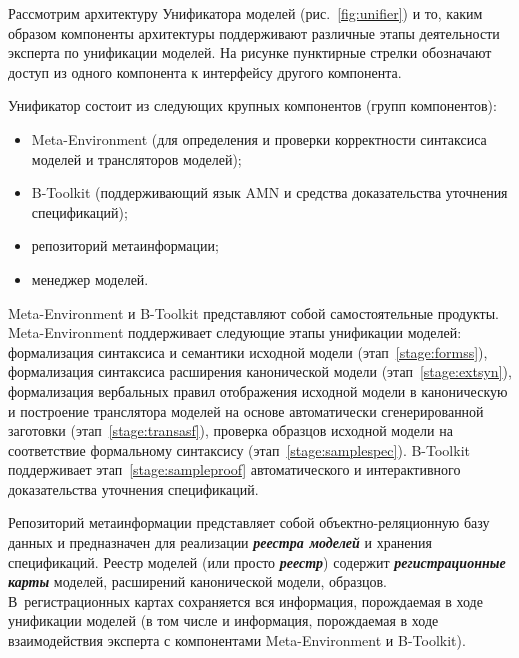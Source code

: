 \begin{multicols}{2}
Рассмотрим архитектуру Унификатора моделей (рис.~\ref{fig:unifier})
и то, каким образом компоненты архитектуры
поддерживают различные этапы дея\-тель\-ности эксперта по унификации моделей.
На рисунке пунктирные стрелки обозначают доступ из одного компонента
к интерфейсу другого компонента.

Унификатор состоит из следующих крупных компонентов (групп компонентов):
\begin{itemize}
\item Meta-Environment (для определения и проверки корректности
синтаксиса моделей и трансляторов моделей);
\item B-Toolkit (поддерживающий язык AMN и средства
доказательства уточнения спецификаций);
\item репозиторий метаинформации;
\item менеджер моделей.
\end{itemize}

Meta-Environment и B-Toolkit представляют собой самостоятельные продукты.
Meta-Environment поддерживает следующие этапы унификации моделей:
формализация синтаксиса и семантики исходной модели (этап~\ref{stage:formss}),
формализация синтаксиса расширения канонической модели (этап~\ref{stage:extsyn}),\linebreak
формализация вербальных правил отображения исходной модели в каноническую
и построение транслятора моделей на основе автоматически сгенерированной заготовки
(этап~\ref{stage:transasf}), проверка образцов исходной модели
на соответствие формальному синтаксису (этап~\ref{stage:samplespec}).
B-Toolkit поддерживает этап~\ref{stage:sampleproof} автоматического и интерактивного
доказательства уточнения спецификаций.

Репозиторий метаинформации представляет собой объ\-ек\-т\-но-ре\-ля\-ци\-он\-ную базу
данных и предна\-зна\-чен для реализации {\bfseries\textit{реестра моделей}}
и хра\-нения спецификаций. Реестр моделей (или прос\-то {\bfseries\textit{реестр}})
содержит {\bfseries\textit{регистрационные карты}} моделей,
расширений канонической модели, образцов. В~ре\-гист\-ра\-ци\-он\-ных
картах сохраняется вся информация, порож\-да\-е\-мая в ходе унификации моделей
(в том чис\-ле и информация, порождаемая в ходе взаимодействия эксперта с
компонентами Meta-Environment и B-Toolkit).

\pagebreak
\end{multicols}

\begin{figure} %
\vspace*{1pt}
\begin{center}
\mbox{%
\epsfxsize=126.593mm
}
\end{center}
\vspace*{-9pt}
\end{figure}

